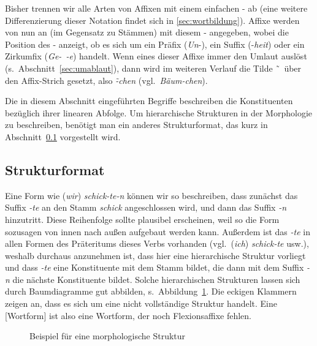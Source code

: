 Bisher trennen wir alle Arten von Affixen mit einem einfachen - ab (eine weitere Differenzierung dieser Notation findet sich in \ref{sec:wortbildung}).
Affixe werden von nun an (im Gegensatz zu Stämmen) mit diesem - angegeben, wobei die Position des - anzeigt, ob es sich um ein Präfix (\textit{Un}-), ein Suffix (-\textit{heit}) oder ein Zirkumfix (\textit{Ge-~-e}) handelt.
Wenn eines dieser Affixe immer den Umlaut auslöst (s.\ Abschnitt~\ref{sec:umablaut}), dann wird im weiteren Verlauf die Tilde {\~\ }\ über den Affix-Strich gesetzt, also \zB \mbox{\textit{\~-chen}} (vgl.\ \textit{Bäum-chen}).

Die in diesem Abschnitt eingeführten Begriffe beschreiben die Konstituenten bezüglich ihrer linearen Abfolge.
Um hierarchische Strukturen in der Morphologie zu beschreiben, benötigt man ein anderes Strukturformat, das kurz in Abschnitt~\ref{sec:morphstrukform} vorgestellt wird.

\subsection{Strukturformat}

\label{sec:morphstrukform}

Eine Form wie (\textit{wir}) \textit{schick-te-n} können wir so beschreiben, dass zunächst das Suffix \textit{-te} an den Stamm \textit{schick} angeschlossen wird, und dann das Suffix \textit{-n} hinzutritt.
Diese Reihenfolge sollte plausibel erscheinen, weil so die Form sozusagen von innen nach außen aufgebaut werden kann.
Außerdem ist das \textit{-te} in allen Formen des Präteritums dieses Verbs vorhanden (vgl.\ (\textit{ich}) \textit{schick-te} usw.), weshalb durchaus anzunehmen ist, dass hier eine hierarchische Struktur vorliegt und dass \textit{-te} eine Konstituente mit dem Stamm bildet, die dann mit dem Suffix \textit{-n} die nächste Konstituente bildet.
Solche hierarchischen Strukturen lassen sich durch Baumdiagramme gut abbilden, s.\ Abbildung~\ref{fig:flextree}.
Die eckigen Klammern zeigen an, dass es sich um eine nicht vollständige Struktur handelt.
Eine [Wortform] ist also eine Wortform, der noch Flexionsaffixe fehlen.

\begin{figure}[!h]
  \centering
  \caption{Beispiel für eine morphologische Struktur}
  \label{fig:flextree}
\end{figure}

